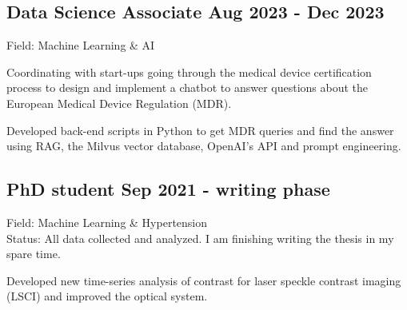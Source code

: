 \documentclass[a4paper,12pt]{article}
\begin{document}


\subsection{Data Science Associate \hfill Aug 2023 - Dec 2023}
\vspace*{1pt}
Field: Machine Learning \& AI \\
\vspace*{\spaceAfterField}
\begin{zitemize}
\item Coordinating with start-ups going through the medical device certification process to design and implement a chatbot to answer questions about the European Medical Device Regulation (MDR).
\item Developed back-end scripts in Python to get MDR queries and find the answer using RAG, the Milvus vector database, OpenAI's API and prompt engineering.
\end{zitemize}
\vspace*{5pt}


\subsection{PhD student \hfill Sep 2021 - writing phase}
\vspace*{1pt}
Field: Machine Learning \& Hypertension \\
Status: All data collected and analyzed. I am finishing writing the thesis in my spare time.
\vspace*{\spaceAfterField}
\begin{zitemize}
\item Developed new time-series analysis of contrast for laser speckle contrast imaging (LSCI) and improved the optical system.
\end{zitemize}
\vspace*{5pt}

\end{document}
